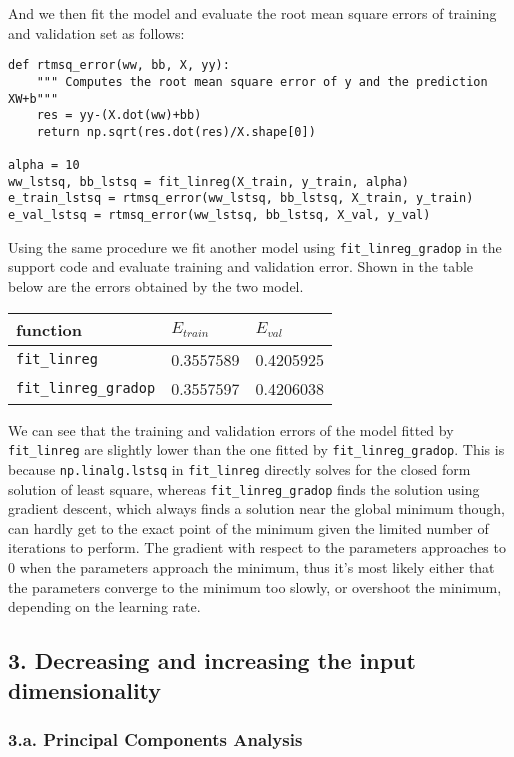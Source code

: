 \documentclass[11pt]{article}
\begin{document}
And we then fit the model and evaluate the root mean square errors of
training and validation set as follows:

\begin{verbatim}
def rtmsq_error(ww, bb, X, yy):
    """ Computes the root mean square error of y and the prediction XW+b"""
    res = yy-(X.dot(ww)+bb)
    return np.sqrt(res.dot(res)/X.shape[0])

alpha = 10
ww_lstsq, bb_lstsq = fit_linreg(X_train, y_train, alpha)
e_train_lstsq = rtmsq_error(ww_lstsq, bb_lstsq, X_train, y_train)
e_val_lstsq = rtmsq_error(ww_lstsq, bb_lstsq, X_val, y_val)
\end{verbatim}

Using the same procedure we fit another model using
\texttt{fit\_linreg\_gradop} in the support code and evaluate training
and validation error. Shown in the table below are the errors obtained
by the two model.

\begin{longtable}[]{@{}lll@{}}
\toprule
function & \(E_{train}\) & \(E_{val}\)\tabularnewline
\midrule
\endhead
\texttt{fit\_linreg} & 0.3557589 & 0.4205925\tabularnewline
\texttt{fit\_linreg\_gradop} & 0.3557597 & 0.4206038\tabularnewline
\bottomrule
\end{longtable}

We can see that the training and validation errors of the model fitted
by \texttt{fit\_linreg} are slightly lower than the one fitted by
\texttt{fit\_linreg\_gradop}. This is because \texttt{np.linalg.lstsq}
in \texttt{fit\_linreg} directly solves for the closed form solution of
least square, whereas \texttt{fit\_linreg\_gradop} finds the solution
using gradient descent, which always finds a solution near the global
minimum though, can hardly get to the exact point of the minimum given
the limited number of iterations to perform. The gradient with respect
to the parameters approaches to 0 when the parameters approach the
minimum, thus it's most likely either that the parameters converge to
the minimum too slowly, or overshoot the minimum, depending on the
learning rate.

\hypertarget{decreasing-and-increasing-the-input-dimensionality}{%
\subsection{3. Decreasing and increasing the input
dimensionality}\label{decreasing-and-increasing-the-input-dimensionality}}

\hypertarget{a.-principal-components-analysis}{%
\subsubsection{3.a. Principal Components
Analysis}\label{a.-principal-components-analysis}}
\end{document}
